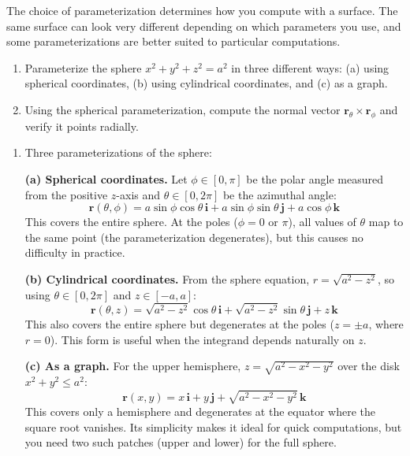 \begin{example}
The choice of parameterization determines how you compute with a surface. The same surface can look very different depending on which parameters you use, and some parameterizations are better suited to particular computations.

\begin{enumerate}
\item Parameterize the sphere $x^2 + y^2 + z^2 = a^2$ in three different ways: (a) using spherical coordinates, (b) using cylindrical coordinates, and (c) as a graph.

\item Using the spherical parameterization, compute the normal vector $\mathbf{r}_\theta \times \mathbf{r}_\phi$ and verify it points radially.
\end{enumerate}

\begin{solution}
\begin{enumerate}
\item Three parameterizations of the sphere:

\textbf{(a) Spherical coordinates.} Let $\phi \in [0, \pi]$ be the polar angle measured from the positive $z$-axis and $\theta \in [0, 2\pi]$ be the azimuthal angle:
\[
\mathbf{r}(\theta, \phi) = a\sin\phi\cos\theta\,\mathbf{i} + a\sin\phi\sin\theta\,\mathbf{j} + a\cos\phi\,\mathbf{k}
\]
This covers the entire sphere. At the poles ($\phi = 0$ or $\pi$), all values of $\theta$ map to the same point (the parameterization degenerates), but this causes no difficulty in practice.

\textbf{(b) Cylindrical coordinates.} From the sphere equation, $r = \sqrt{a^2 - z^2}$, so using $\theta \in [0, 2\pi]$ and $z \in [-a, a]$:
\[
\mathbf{r}(\theta, z) = \sqrt{a^2 - z^2}\cos\theta\,\mathbf{i} + \sqrt{a^2 - z^2}\sin\theta\,\mathbf{j} + z\,\mathbf{k}
\]
This also covers the entire sphere but degenerates at the poles ($z = \pm a$, where $r = 0$). This form is useful when the integrand depends naturally on $z$.

\textbf{(c) As a graph.} For the upper hemisphere, $z = \sqrt{a^2 - x^2 - y^2}$ over the disk $x^2 + y^2 \leq a^2$:
\[
\mathbf{r}(x,y) = x\,\mathbf{i} + y\,\mathbf{j} + \sqrt{a^2 - x^2 - y^2}\,\mathbf{k}
\]
This covers only a hemisphere and degenerates at the equator where the square root vanishes. Its simplicity makes it ideal for quick computations, but you need two such patches (upper and lower) for the full sphere.


\end{enumerate}
\end{solution}
\end{example}
